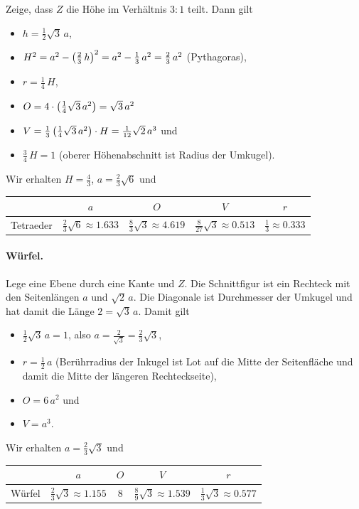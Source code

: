 \documentclass[11pt]{article}
\begin{document}
Zeige, dass $Z$ die Höhe im Verhältnis $3:1$ teilt.  Dann gilt
\begin{itemize}
\item $h=\frac12\sqrt{3}\,a$,
\item $H^2=a^2-\left(\frac23\,h\right)^2=a^2-\frac13\,a^2=\frac23\,a^2$ (Pythagoras), 
\item $r=\frac14\,H$,
\item $O=4\cdot \left(\frac14\sqrt{3}\,a^2\right)=\sqrt{3}\,a^2$ 
\item $V=\frac13 \left(\frac14\sqrt{3}\,a^2\right)\cdot H = \frac{1}{12}\sqrt{2}\,a^3$
  und
\item $\frac34\,H=1$ (oberer Höhenabschnitt ist Radius der Umkugel).
\end{itemize}
Wir erhalten $H=\frac43$, $a=\frac23\sqrt{6}$ und
\begin{center}
  \begin{tabular}{|l|c|c|c|c|}\hline
    & $a$ & $O$ & $V$ & $r$ \\\hline
    Tetraeder & $\frac23\sqrt{6}\approx 1.633$ & $\frac83\sqrt{3} \approx
    4.619$ & $\frac{8}{27}\sqrt{3} \approx 0.513$ & $\frac13 \approx 0.333$
    \\\hline  
  \end{tabular}
\end{center}

\paragraph{Würfel.}
Lege eine Ebene durch eine Kante und $Z$. Die Schnittfigur ist ein
Rechteck mit den Seitenlängen $a$ und $\sqrt{2}\,a$.  Die Diagonale ist
Durchmesser der Umkugel und hat damit die Länge $2=\sqrt{3}\,a$. Damit gilt
\begin{itemize}
\item $\frac12\sqrt{3}\,a=1$, also $a=\frac{2}{\sqrt{3}}=\frac23\sqrt{3}$, 
\item $r=\frac12\,a$ (Berührradius der Inkugel ist Lot auf die Mitte der
  Seitenfläche und damit die Mitte der längeren Rechteckseite),
\item $O=6\,a^2$ und 
\item $V=a^3$.
\end{itemize}
Wir erhalten $a=\frac23\sqrt{3}$ und
\begin{center}
  \begin{tabular}{|l|c|c|c|c|}\hline
    & $a$ & $O$ & $V$ & $r$ \\\hline
    Würfel & $\frac23\sqrt{3}\approx 1.155$ & $8$ & $\frac{8}{9}\sqrt{3}
    \approx 1.539$ & $\frac13\sqrt{3} \approx 0.577$ \\\hline  
  \end{tabular}
\end{center}
\end{document}
